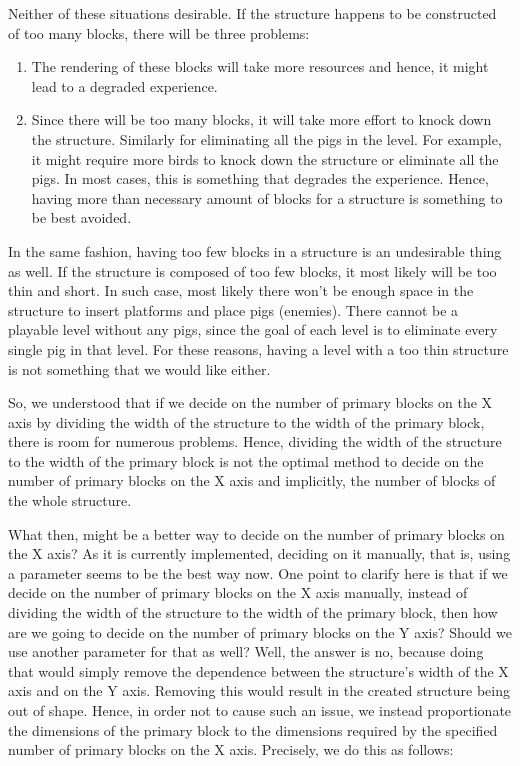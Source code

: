 \documentclass[12pt]{dalthesis}
\begin{document}
\begin{enumerate}
  Neither of these situations desirable. If the structure happens to be constructed of too many blocks, there will be three problems:

  \begin{enumerate}
    \item The rendering of these blocks will take more resources and hence, it might lead to a degraded experience.

    \item Since there will be too many blocks, it will take more effort to knock down the structure. Similarly for eliminating all the pigs in the level. For example, it might require more birds to knock down the structure or eliminate all the pigs. In most cases, this is something that degrades the experience. Hence, having more than necessary amount of blocks for a structure is something to be best avoided.
  \end{enumerate}

  In the same fashion, having too few blocks in a structure is an undesirable thing as well. If the structure is composed of too few blocks, it most likely will be too thin and short. In such case, most likely there won't be enough space in the structure to insert platforms and place pigs (enemies). There cannot be a playable level without any pigs, since the goal of each level is to eliminate every single pig in that level. For these reasons, having a level with a too thin structure is not something that we would like either.

  So, we understood that if we decide on the number of primary blocks on the X axis by dividing the width of the structure to the width of the primary block, there is room for numerous problems. Hence, dividing the width of the structure to the width of the primary block is not the optimal method to decide on the number of primary blocks on the X axis and implicitly, the number of blocks of the whole structure.

  What then, might be a better way to decide on the number of primary blocks on the X axis? As it is currently implemented, deciding on it manually, that is, using a parameter seems to be the best way now. One point to clarify here is that if we decide on the number of primary blocks on the X axis manually, instead of dividing the width of the structure to the width of the primary block, then how are we going to decide on the number of primary blocks on the Y axis? Should we use another parameter for that as well? Well, the answer is no, because doing that would simply remove the dependence between the structure's width of the X axis and on the Y axis. Removing this would result in the created structure being out of shape. Hence, in order not to cause such an issue, we instead proportionate the dimensions of the primary block to the dimensions required by the specified number of primary blocks on the X axis. Precisely, we do this as follows:


\end{enumerate}
\end{document}
